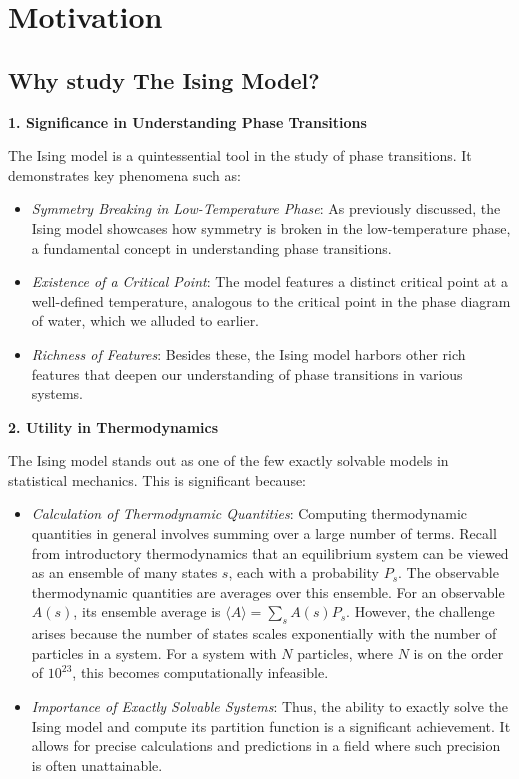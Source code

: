 \section{Motivation}
\label{sec:motivation}
\subsection{Why study The Ising Model?}
\textbf{1. Significance in Understanding Phase Transitions}

The Ising model is a quintessential tool in the study of phase transitions. It
demonstrates key phenomena such as:

\begin{itemize}
  \item \textit{Symmetry Breaking in Low-Temperature Phase}: As previously
  discussed, the Ising model showcases how symmetry is broken in the
  low-temperature phase, a fundamental concept in understanding phase
  transitions.
  \item \textit{Existence of a Critical Point}: The model features a distinct
  critical point at a well-defined temperature, analogous to the critical point
  in the phase diagram of water, which we alluded to earlier.
  \item \textit{Richness of Features}: Besides these, the Ising model harbors
  other rich features that deepen our understanding of phase transitions in
  various systems.
\end{itemize}

\textbf{2. Utility in Thermodynamics}

The Ising model stands out as one of the few exactly solvable models in
statistical mechanics. This is significant because:

\begin{itemize}
  \item \textit{Calculation of Thermodynamic Quantities}: Computing
  thermodynamic quantities in general involves summing over a large number of
  terms. Recall from introductory thermodynamics that an equilibrium system can
  be viewed as an ensemble of many states \( s \), each with a probability \(
  P_s \). The observable thermodynamic quantities are averages over this
  ensemble. For an observable \( A(s) \), its ensemble average is \( \langle A
  \rangle = \sum_s A(s) P_s \). However, the challenge arises because the number
  of states scales exponentially with the number of particles in a system. For a
  system with \( N \) particles, where \( N \) is on the order of \( 10^{23} \),
  this becomes computationally infeasible.
  \item \textit{Importance of Exactly Solvable Systems}: Thus, the ability to
  exactly solve the Ising model and compute its partition function is a
  significant achievement. It allows for precise calculations and predictions in
  a field where such precision is often unattainable.
\end{itemize}

